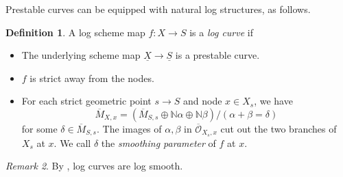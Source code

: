 \documentclass[a4paper,11pt]{amsart} %
\numberwithin{equation}{subsection}
\newcommand{\bb}[1]{{\mathbb{#1}}}
\newcommand{\ca}[1]{{\mathcal{#1}}}
\newcommand{\ul}[1]{{\underline{#1}}}
\def\o#1{\overline{#1}}
\theoremstyle{definition}
\newtheorem{definition}{Definition}[section]
\theoremstyle{plain}%
\newtheorem{theorem}[definition]{Theorem}
\theoremstyle{remark}
\newtheorem{remark}[definition]{Remark}
\begin{document}
Prestable curves can be equipped with natural log structures, as follows.
\begin{definition}\label{definition:log_curve}
    A log scheme map $f \colon X \to S$ is a \emph{log curve} if
    \begin{itemize}
        \item The underlying scheme map $\ul X \to \ul S$ is a prestable curve.
        \item $f$ is strict away from the nodes.
        \item For each strict geometric point $s \to S$ and node $x\in X_s$, we have
        \[
        \o M_{X,x}=(\o M_{S,s} \oplus \bb N\alpha \oplus \bb N\beta)/(\alpha+\beta=\delta)
        \]
        for some $\delta\in \o M_{S,s}$. The images of $\alpha,\beta$ in $\o{\ca O}_{X_s,x}$ cut out the two branches of $X_s$ at $x$. We call $\delta$ the \emph{smoothing parameter} of $f$ at $x$.
    \end{itemize}
\end{definition}

\begin{remark}
    By \cite[\S 1]{Kato2000Log-smooth-defo}, log curves are log smooth.
\end{remark}


\end{document}
